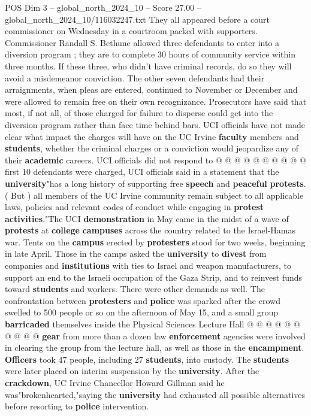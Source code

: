\begin{textsample}{POS Dim 3 – global\_north\_2024\_10 – Score 27.00 – global\_north\_2024\_10/116032247.txt}
They all appeared before a court commissioner on Wednesday in a courtroom packed with supporters.
Commissioner Randall S.
Bethune allowed three defendants to enter into a diversion program ; they are to complete 30 hours of community service within three months.
If these three, who didn't have criminal records, do so they will avoid a misdemeanor conviction.
The other seven defendants had their arraignments, when pleas are entered, continued to November or December and were allowed to remain free on their own recognizance.
Prosecutors have said that most, if not all, of those charged for failure to disperse could get into the diversion program rather than face time behind bars.
UCI officials have not made clear what impact the charges will have on the UC Irvine \textbf{faculty} members and \textbf{students}, whether the criminal charges or a conviction would jeopardize any of their \textbf{academic} careers.
UCI officials did not respond to @ @ @ @ @ @ @ @ @ @ first 10 defendants were charged, UCI officials said in a statement that the \textbf{university}"has a long history of supporting free \textbf{speech} and \textbf{peaceful} \textbf{protests}. ( But ) all members of the UC Irvine community remain subject to all applicable laws, policies and relevant codes of conduct while engaging in \textbf{protest} \textbf{activities}."The UCI \textbf{demonstration} in May came in the midst of a wave of \textbf{protests} at \textbf{college} \textbf{campuses} across the country related to the Israel-Hamas war.
Tents on the \textbf{campus} erected by \textbf{protesters} stood for two weeks, beginning in late April.
Those in the camps asked the \textbf{university} to \textbf{divest} from companies and \textbf{institutions} with ties to Israel and weapon manufacturers, to support an end to the Israeli occupation of the Gaza Strip, and to reinvest funds toward \textbf{students} and workers.
There were other demands as well.
The confrontation between \textbf{protesters} and \textbf{police} was sparked after the crowd swelled to 500 people or so on the afternoon of May 15, and a small group \textbf{barricaded} themselves inside the Physical Sciences Lecture Hall @ @ @ @ @ @ @ @ @ @ \textbf{gear} from more than a dozen law \textbf{enforcement} agencies were involved in clearing the group from the lecture hall, as well as those in the \textbf{encampment}. \textbf{Officers} took 47 people, including 27 \textbf{students}, into custody.
The \textbf{students} were later placed on interim suspension by the \textbf{university}.
After the \textbf{crackdown}, UC Irvine Chancellor Howard Gillman said he was"brokenhearted,"saying the \textbf{university} had exhausted all possible alternatives before resorting to \textbf{police} intervention.

\end{textsample}
